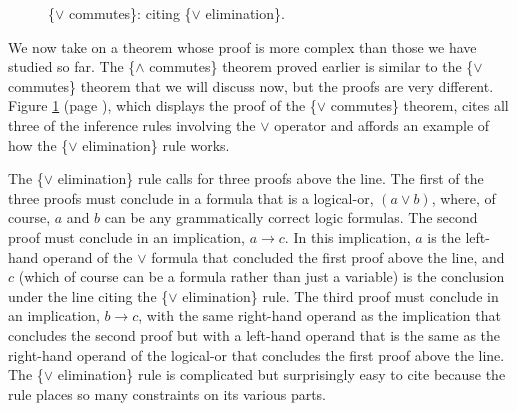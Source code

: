 {\begin{figure}
\begin{center}
\begin{spacing}{0.9}
\begin{tabular}{ll}
\end{tabular}
\end{spacing}
\end{center}
\caption{\{$\vee$ commutes\}: citing \{$\vee$ elimination\}.}
\label{fig:or-commutes-proof}
\end{figure}

We now take on a theorem whose proof is more complex
than those we have studied so far.
The \{$\wedge$ commutes\} theorem proved earlier
is similar to the \{$\vee$ commutes\} theorem
that we will discuss now, but the proofs are very different.
Figure \ref{fig:or-commutes-proof} (page \pageref{fig:or-commutes-proof}),
which displays the proof of the \{$\vee$ commutes\} theorem,
cites all three of the inference rules involving the $\vee$ operator
and affords an example of how the \{$\vee$ elimination\} rule works.

The \{$\vee$ elimination\} rule calls for three proofs above the line.
The
first of the three proofs must conclude in a formula
that is a logical-or, $(a \vee b)$, where, of course,
$a$ and $b$ can be any grammatically correct logic formulas.
The second proof must conclude in an implication, $a \rightarrow c$.
In this implication, $a$ is the left-hand operand of the $\vee$ formula
that concluded the first proof above the line,
and $c$ (which of course can be a formula rather than just a variable)
is the conclusion under the line citing the \{$\vee$ elimination\} rule.
The third proof must conclude in an implication, $b \rightarrow c$,
with the same right-hand operand as the implication that concludes
the second proof but with a left-hand operand that is the same
as the right-hand operand of the logical-or that concludes the
first proof above the line.
The \{$\vee$ elimination\} rule is complicated
but surprisingly easy to cite
because the rule places so many constraints on its various parts.

}
